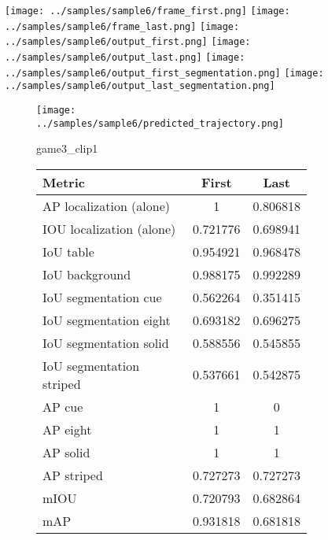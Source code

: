 \begin{figure}
    \texttt{[image: ../samples/sample6/frame\_first.png]}
    \texttt{[image: ../samples/sample6/frame\_last.png]}
    \newline
    \texttt{[image: ../samples/sample6/output\_first.png]}
    \texttt{[image: ../samples/sample6/output\_last.png]}
    \newline
    \texttt{[image: ../samples/sample6/output\_first\_segmentation.png]}
    \texttt{[image: ../samples/sample6/output\_last\_segmentation.png]}
    \newline
    \begin{subfigure}[b]{0.49\textwidth}
        \vspace{20pt}
        \texttt{[image: ../samples/sample6/predicted\_trajectory.png]}
        \caption*{game3\_clip1}
    \end{subfigure}
\begin{subfigure}[b]{0.49\textwidth}
    \begin{tabular}{|l|c|c|}
        \hline
        \textbf{Metric} & \textbf{First} & \textbf{Last} \\
        \hline
        AP localization (alone) & 1 & 0.806818 \\ 
        IOU localization (alone) & 0.721776 & 0.698941 \\ 
        \hline
        IoU table & 0.954921 & 0.968478 \\ 
        IoU background & 0.988175 & 0.992289 \\ 
        \hline
        IoU segmentation cue & 0.562264 & 0.351415 \\ 
        IoU segmentation eight & 0.693182 & 0.696275 \\ 
        IoU segmentation solid & 0.588556 & 0.545855 \\ 
        IoU segmentation striped & 0.537661 & 0.542875 \\ 
        \hline
        AP cue & 1 & 0 \\ 
        AP eight & 1 & 1 \\ 
        AP solid & 1 & 1 \\ 
        AP striped & 0.727273 & 0.727273 \\ 
        \hline
        mIOU & 0.720793 & 0.682864 \\ 
        mAP & 0.931818 & 0.681818 \\ 
        \hline
    \end{tabular}    
\end{subfigure}
\end{figure}

